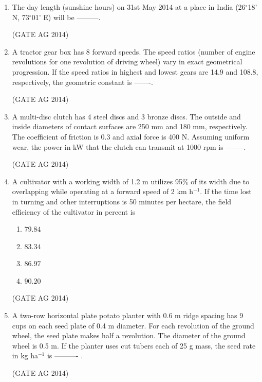 \documentclass[journal,12pt,onecolumn]{IEEEtran}
\begin{document}
\begin{enumerate}
    \item The day length (sunshine hours) on 31st May 2014 at a place in India (26$^\circ$18' N, 73$^\circ$01' E) will be ---------.

    \hfill(GATE AG 2014)

    \item A tractor gear box has 8 forward speeds. The speed ratios (number of engine revolutions for one revolution of driving wheel) vary in exact geometrical progression. If the speed ratios in highest and lowest gears are 14.9 and 108.8, respectively, the geometric constant is -------.

    \hfill(GATE AG 2014)

    \item A multi-disc clutch has 4 steel discs and 3 bronze discs. The outside and inside diameters of contact surfaces are 250 mm and 180 mm, respectively. The coefficient of friction is 0.3 and axial force is 400 N. Assuming uniform wear, the power in kW that the clutch can transmit at 1000 rpm is --------.

    \hfill(GATE AG 2014)

    \item A cultivator with a working width of 1.2 m utilizes 95\% of its width due to overlapping while operating at a forward speed of 2 km h$^{-1}$. If the time lost in turning and other interruptions is 50 minutes per hectare, the field efficiency of the cultivator in percent is
      \begin{multicols}{4}
    \begin{enumerate}
        \item $79.84$
        \item $83.34$
        \item $86.97$
        \item $90.20$
    \end{enumerate}
     \end{multicols}
    \hfill(GATE AG 2014)

    \item A two-row horizontal plate potato planter with 0.6 m ridge spacing has 9 cups on each seed plate of 0.4 m diameter. For each revolution of the ground wheel, the seed plate makes half a revolution. The diameter of the ground wheel is 0.5 m. If the planter uses cut tubers each of 25 g mass, the seed rate in kg ha$^{-1}$ is ---------- .

    \hfill(GATE AG 2014)


\end{enumerate}
\end{document}
